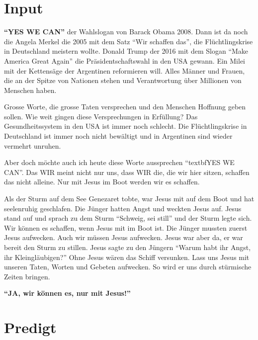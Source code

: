 \documentclass{../../inc/mybib}
\begin{document}
\section{ Input }
\begin{spacing}{1.5}    
   \textbf{\enquote{YES WE CAN}} der Wahlslogan von Barack Obama 2008. Dann ist da noch die Angela Merkel die 2005 mit dem Satz \enquote{Wir schaffen das}, die Flüchtlingskrise in Deutschland meistern wollte. Donald Trump der 2016 mit dem Slogan \enquote{Make America Great Again} die Präsidentschaftswahl in den USA gewann. Ein Milei mit der Kettensäge der Argentinen reformieren will. Alles Männer und Frauen, die an der Spitze von Nationen stehen und Verantwortung über Millionen von Menschen haben.
    \begin{block}
    Grosse Worte, die grosse Taten versprechen und den Menschen Hoffnung geben sollen. Wie weit gingen diese Versprechungen in Erfüllung? Das Gesundheitssystem in den USA ist immer noch schlecht. Die Flüchtlingskrise in Deutschland ist immer noch nicht bewältigt und in Argentinen sind wieder vermehrt unruhen.
    \end{block}
    \begin{block}
    Aber doch möchte auch ich heute diese Worte aussprechen \enquote{textbf{YES WE CAN}}. Das WIR meint nicht nur uns, dass WIR die, die wir hier sitzen, schaffen das nicht alleine. Nur mit Jesus im Boot werden wir es schaffen. 
    \end{block}
    Als der Sturm auf dem See Genezaret tobte, war Jesus mit auf dem Boot und hat seelenruhig geschlafen. Die Jünger hatten Angst und weckten Jesus auf. Jesus stand auf und sprach zu dem Sturm \enquote{Schweig, sei still} und der Sturm legte sich. Wir können es schaffen, wenn Jesus mit im Boot ist. Die Jünger mussten zuerst Jesus aufwecken. Auch wir müssen Jesus aufwecken. Jesus war aber da, er war bereit den Sturm zu stillen. Jesus sagte zu den Jüngern \enquote{Warum habt ihr Angst, ihr Kleingläubigen?} Ohne Jesus wären das Schiff versunken. Lass uns Jesus mit unseren Taten, Worten und Gebeten aufwecken. So wird er uns durch stürmische Zeiten bringen.

    \textbf{\enquote{JA, wir können es, nur mit Jesus!}}

\end{spacing}

\section{Predigt}
\end{document}
